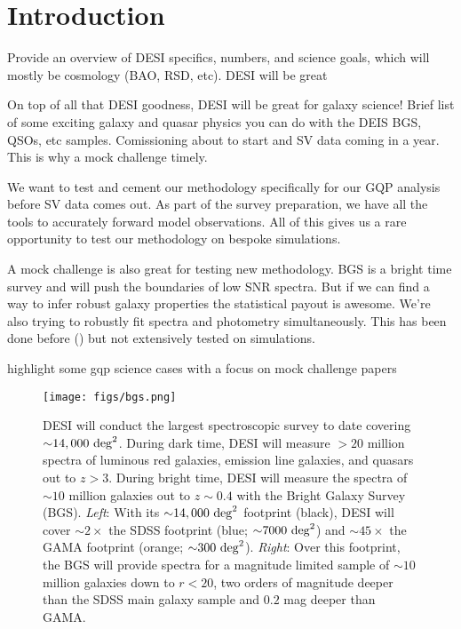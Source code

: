 \section{Introduction} \label{sec:intro} 
Provide an overview of DESI specifics, numbers, and science goals, which will 
mostly be cosmology (BAO, RSD, etc). DESI will be great

On top of all that DESI goodness, DESI will be great for galaxy science! 
Brief list of some exciting galaxy and quasar physics you can do with the
DEIS BGS, QSOs, etc samples.
Comissioning about to start and SV data coming in a year. 
This is why a mock challenge timely.

We want to test and cement our methodology specifically for our GQP 
analysis before SV data comes out. 
As part of the survey preparation, we have all the tools to accurately 
forward model observations. 
All of this gives us a rare opportunity to test our methodology on bespoke
simulations. 

A mock challenge is also great for testing new methodology.
BGS is a bright time survey and will push the boundaries of low SNR 
spectra. But if we can find a way to  infer robust galaxy properties the 
statistical payout is awesome.  
We're also trying to robustly fit spectra and photometry simultaneously. 
This has been done before () but not extensively tested 
on simulations. 

highlight some gqp science cases with a focus on mock challenge papers

\begin{figure}
\begin{center}
\texttt{[image: figs/bgs.png]} 
\caption{DESI will conduct the largest spectroscopic survey to 
date covering ${\sim}14,000~{\rm deg}^2$. During dark time, DESI will measure
${>}20$ million spectra of luminous red galaxies, emission line galaxies, and 
quasars out to $z > 3$. During bright time, DESI will measure the spectra of 
${\sim}10$ million galaxies out to $z{\sim}0.4$  with the Bright Galaxy Survey (BGS).
{\em Left}: With its ${\sim}14,000~{\rm deg}^2$ footprint (black), DESI will 
cover ${\sim}2\times$ the SDSS footprint (blue; ${\sim}7000~{\rm deg}^2$) 
and ${\sim}45\times$ the GAMA footprint (orange; ${\sim}300~{\rm deg}^2$). 
{\em Right}: Over this footprint, the BGS will provide spectra for a magnitude 
limited sample of ${\sim}10$ million galaxies down to $r < 20$, two orders of 
magnitude deeper than the SDSS main galaxy sample and $0.2$ mag deeper than GAMA.}
\label{fig:bgs}
\end{center}
\end{figure}
